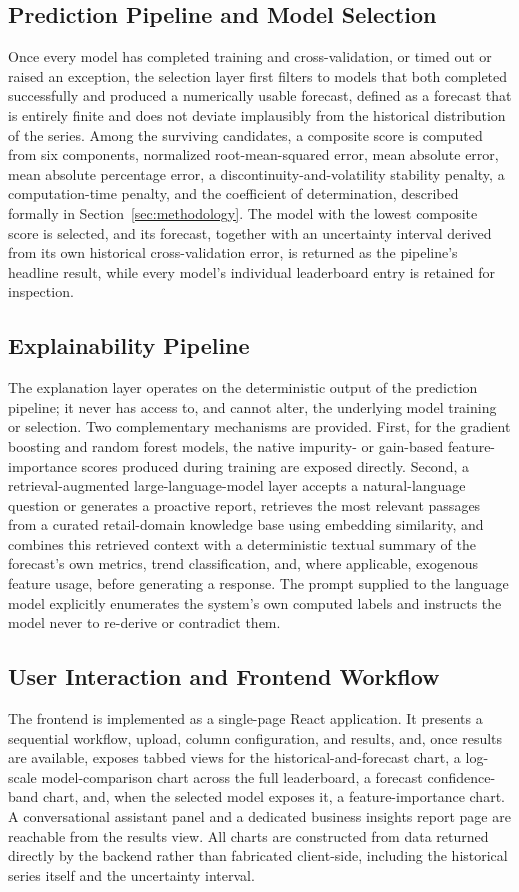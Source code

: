 \subsection{Prediction Pipeline and Model Selection}
Once every model has completed training and cross-validation, or timed out or raised an exception, the selection layer first filters to models that both completed successfully and produced a numerically usable forecast, defined as a forecast that is entirely finite and does not deviate implausibly from the historical distribution of the series. Among the surviving candidates, a composite score is computed from six components, normalized root-mean-squared error, mean absolute error, mean absolute percentage error, a discontinuity-and-volatility stability penalty, a computation-time penalty, and the coefficient of determination, described formally in Section~\ref{sec:methodology}. The model with the lowest composite score is selected, and its forecast, together with an uncertainty interval derived from its own historical cross-validation error, is returned as the pipeline's headline result, while every model's individual leaderboard entry is retained for inspection.

\subsection{Explainability Pipeline}
The explanation layer operates on the deterministic output of the prediction pipeline; it never has access to, and cannot alter, the underlying model training or selection. Two complementary mechanisms are provided. First, for the gradient boosting and random forest models, the native impurity- or gain-based feature-importance scores produced during training are exposed directly. Second, a retrieval-augmented large-language-model layer accepts a natural-language question or generates a proactive report, retrieves the most relevant passages from a curated retail-domain knowledge base using embedding similarity, and combines this retrieved context with a deterministic textual summary of the forecast's own metrics, trend classification, and, where applicable, exogenous feature usage, before generating a response. The prompt supplied to the language model explicitly enumerates the system's own computed labels and instructs the model never to re-derive or contradict them.

\subsection{User Interaction and Frontend Workflow}
The frontend is implemented as a single-page React application. It presents a sequential workflow, upload, column configuration, and results, and, once results are available, exposes tabbed views for the historical-and-forecast chart, a log-scale model-comparison chart across the full leaderboard, a forecast confidence-band chart, and, when the selected model exposes it, a feature-importance chart. A conversational assistant panel and a dedicated business insights report page are reachable from the results view. All charts are constructed from data returned directly by the backend rather than fabricated client-side, including the historical series itself and the uncertainty interval.

